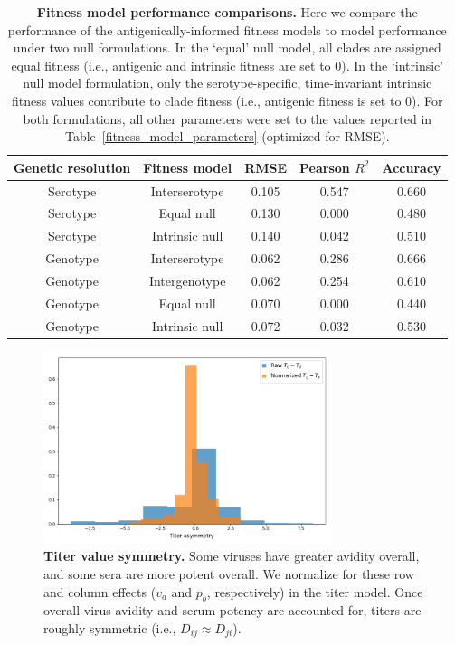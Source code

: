 \documentclass[11pt,oneside,letterpaper]{article}
\begin{document}
\begin{table}[ht]
  \centering
  \caption{
    \textbf{Fitness model performance comparisons.}
    Here we compare the performance of the antigenically-informed fitness models to model performance under two null formulations.
    In the `equal' null model, all clades are assigned equal fitness (i.e., antigenic and intrinsic fitness are set to 0).
    In the `intrinsic' null model formulation, only the serotype-specific, time-invariant intrinsic fitness values contribute to clade fitness (i.e., antigenic fitness is set to 0).
    For both formulations, all other parameters were set to the values reported in Table~\ref{fitness_model_parameters} (optimized for RMSE).
  }
  \label{fitness_model_performance}
  \begin{tabular}{ c c c c c }
    \hline
    Genetic resolution  & Fitness model  & RMSE   & Pearson $R^2$ & Accuracy \\
    \hline
    Serotype            & Interserotype  & 0.105  & 0.547         & 0.660 \\
    Serotype            & Equal null     & 0.130  & 0.000         & 0.480 \\
    Serotype            & Intrinsic null & 0.140  & 0.042         & 0.510 \\
    Genotype            & Interserotype  & 0.062  & 0.286         & 0.666 \\
        Genotype            & Intergenotype  & 0.062  & 0.254         & 0.610 \\
    Genotype            & Equal null     & 0.070  & 0.000         & 0.440 \\
    Genotype            & Intrinsic null & 0.072  & 0.032         & 0.530 \\
    \hline
  \end{tabular}
\end{table}

\begin{figure}[ht]
  \centering
  \includegraphics[width=0.75\textwidth]{../figures/png/titer_asymmetry.png}
  \caption{\textbf{Titer value symmetry.}
  Some viruses have greater avidity overall, and some sera are more potent overall.
  We normalize for these row and column effects ($v_a$ and $p_b$, respectively) in the titer model.
  Once overall virus avidity and serum potency are accounted for, titers are roughly symmetric (i.e., $D_{ij} \approx D_{ji}$).
  }
\label{titer_asymmetry}
\end{figure}
\end{document}
